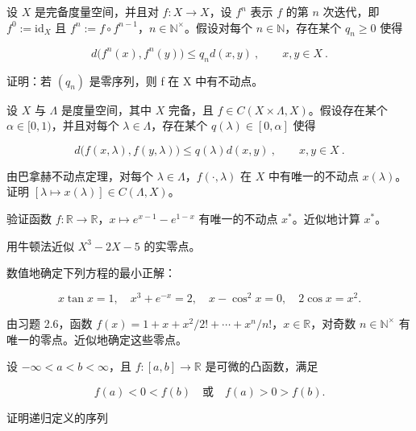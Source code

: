 \exerciseshead

\begin{exercises}
\item

设 $X$ 是完备度量空间，并且对 $f: X \to X$，设 $f^n$ 表示 $f$ 的第 $n$ 次迭代，即 $f^0 := \text{id}_X$ 且 $f^n := f \circ f^{n-1}$，$n \in \mathbb{N}^\times$。假设对每个 $n \in \mathbb{N}$，存在某个 $q_n \geq 0$ 使得

\[
d\bigl(f^{n}(x),f^{n}(y)\bigr)\leq q_{n}d(x,y)~,\qquad x,y\in X~.
\]

证明：若 $ (q_{n}) $ 是零序列，则 f 在 X 中有不动点。

\item

设 $X$ 与 $\Lambda$ 是度量空间，其中 $X$ 完备，且 $f \in C(X \times \Lambda, X)$。假设存在某个 $\alpha \in [0,1)$，并且对每个 $\lambda \in \Lambda$，存在某个 $q(\lambda) \in [0,\alpha]$ 使得

\[
d\big(f(x,\lambda),f(y,\lambda)\big)\leq q(\lambda)d(x,y)~,\qquad x,y\in X~.
\]

由巴拿赫不动点定理，对每个 $ \lambda \in \Lambda $，$ f(\cdot, \lambda) $ 在 $ X $ 中有唯一的不动点 $ x(\lambda) $。证明 $ [\lambda \mapsto x(\lambda)] \in C(\Lambda, X) $。

\item

验证函数 $ f: \mathbb{R} \to \mathbb{R} $，$ x \mapsto e^{x-1} - e^{1-x} $ 有唯一的不动点 $ x^* $。近似地计算 $ x^* $。

\item

用牛顿法近似 $ X^{3} - 2X - 5 $ 的实零点。

\item

数值地确定下列方程的最小正解：

\[
x\tan x=1,\quad x^{3}+e^{-x}=2,\quad x-\cos^{2}x=0,\quad2\cos x=x^{2}.
\]
\item

由习题 2.6，函数 $ f(x) = 1 + x + x^2/2! + \cdots + x^n/n! $，$ x \in \mathbb{R} $，对奇数 $ n \in \mathbb{N}^\times $ 有唯一的零点。近似地确定这些零点。

\item

设 $ -\infty < a < b < \infty $，且 $ f: [a, b] \to \mathbb{R} $ 是可微的凸函数，满足

\[
f(a)<0<f(b)\quad\text{或}\quad f(a)>0>f(b).
\]

证明递归定义的序列


\end{exercises}

